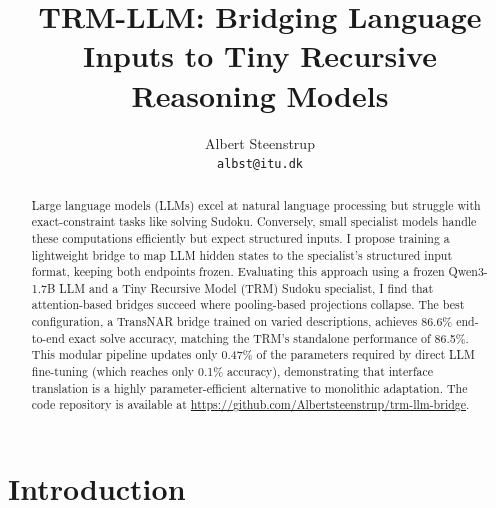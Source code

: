 \documentclass[11pt]{article}
\title{TRM-LLM: Bridging Language Inputs to Tiny Recursive Reasoning Models}
\author{
Albert Steenstrup \\
\texttt{albst@itu.dk}
}
\begin{document}
\maketitle

\begin{abstract}
Large language models (LLMs) excel at natural language processing but struggle with exact-constraint tasks like solving Sudoku. Conversely, small specialist models handle these computations efficiently but expect structured inputs. I propose training a lightweight bridge to map LLM hidden states to the specialist's structured input format, keeping both endpoints frozen. Evaluating this approach using a frozen Qwen3-1.7B LLM and a Tiny Recursive Model (TRM) Sudoku specialist, I find that attention-based bridges succeed where pooling-based projections collapse. The best configuration, a TransNAR bridge trained on varied descriptions, achieves 86.6\% end-to-end exact solve accuracy, matching the TRM's standalone performance of 86.5\%. This modular pipeline updates only 0.47\% of the parameters required by direct LLM fine-tuning (which reaches only 0.1\% accuracy), demonstrating that interface translation is a highly parameter-efficient alternative to monolithic adaptation. The code repository is available at \url{https://github.com/Albertsteenstrup/trm-llm-bridge}.
\end{abstract}

\section{Introduction}
\label{sec:introduction}


\end{document}
